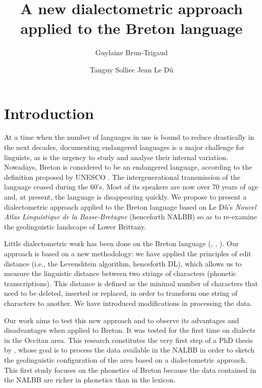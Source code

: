 \documentclass[output=paper]{LSP/langsci}
\author{Guylaine Brun-Trigaud\affiliation{CNRS \& Université de Nice-Sophia-Antipolis, France}\and Tanguy Solliec\affiliation{Université de Paris Descartes, France} \lastand Jean Le Dû\affiliation{Université de Bretagne Occidentale, France}}
\title{A new dialectometric approach applied to the Breton language}
\begin{document}
 

% 
% 

 

\section{Introduction}

At a time when the number of languages in use is bound to reduce drastically in the next decades, documenting endangered languages is a major challenge for linguists, as is the urgency to study and analyse their internal variation. Nowadays, Breton is considered to be an endangered language, according to the definition proposed by UNESCO \citep{moseley_atlas_2010}. The intergenerational transmission of the language ceased during the 60’s. Most of its speakers are now over 70 years of age and, at present, the language is disappearing quickly. We propose to present a dialectometric approach applied to the Breton language based on Le Dû's \textit{Nouvel Atlas Linguistique de la Basse-Bretagne} (henceforth NALBB) \citep{le_du_nouvel_2001} so as to re-examine the geolinguistic landscape of Lower Brittany.

Little dialectometric work has been done on the Breton language (\citealt{german_etude_1984}, \citealt{german_methode_1991}, \citealt{costaouec_linguistic_2012}). Our approach is based on a new methodology: we have applied the principles of edit distance (i.e., the Levenshtein algorithm, henceforth DL), which allows us to measure the linguistic distance between two strings of characters (phonetic transcriptions). This distance is defined as the minimal number of characters that need to be deleted, inserted or replaced, in order to transform one string of characters to another. We have introduced modifications in processing the data.

Our work aims to test this new approach and to observe its advantages and disadvantages when applied to Breton. It was tested for the first time on dialects in the Occitan area. This research constitutes the very first step of a PhD thesis by \citet{solliec_dialectometrie_2014}, whose goal is to process the data available in the NALBB in order to sketch the geolinguistic configuration of the area based on a dialectometric approach. This first study focuses on the phonetics of Breton because the data contained in the NALBB are richer in phonetics than in the lexicon.
\end{document}
